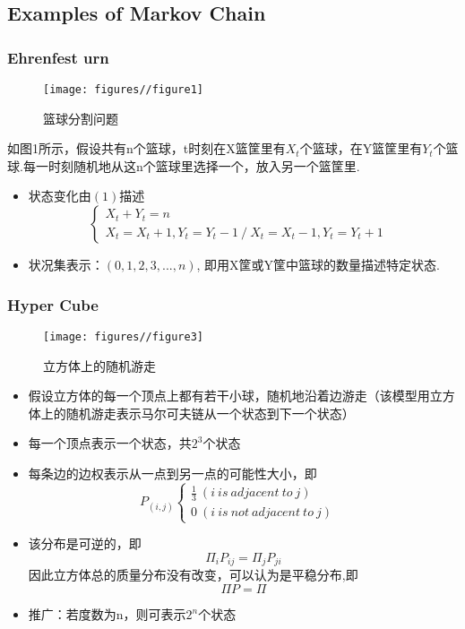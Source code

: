 \documentclass[a4paper, 11pt]{article} %
\begin{document}
\subsection{Examples of Markov Chain}
\subsubsection{Ehrenfest urn}
\begin{figure}[h]
    	\centering
    	\texttt{[image: figures//figure1]}
    	\caption{篮球分割问题}
\end{figure}
\begin{small}
如图1所示，假设共有n个篮球，t时刻在X篮筐里有$X_t$个篮球，在Y篮筐里有$Y_t$个篮球.每一时刻随机地从这n个篮球里选择一个，放入另一个篮筐里.
\begin{itemize}
	\item 状态变化由$(1)$描述
    \begin{equation}  
     \left\{  
             \begin{array}{lr}  
             X_t+Y_t=n &  \\  
             X_t=X_t+1, Y_t=Y_t-1\ /\ X_t=X_t-1,Y_t=Y_t+1 & 
            \end{array}  
    \right.  
    \end{equation}  
	
	\item 状况集表示：$(0,1,2,3,...,n)$, 即用X筐或Y筐中篮球的数量描述特定状态.
\end{itemize}
\end{small}
\newpage
\subsubsection{Hyper Cube}
\begin{small}
\begin{figure}[h]
    	\centering
    	\texttt{[image: figures//figure3]}
    	\caption{立方体上的随机游走}
\end{figure}
\begin{itemize}
	\item 假设立方体的每一个顶点上都有若干小球，随机地沿着边游走（该模型用立方体上的随机游走表示马尔可夫链从一个状态到下一个状态）
	\item 每一个顶点表示一个状态，共$2^3$个状态
	\item 每条边的边权表示从一点到另一点的可能性大小，即
	      \begin{equation}  
           P_{(i,j)}\left\{  
             \begin{array}{lr}  
              \frac{1}{3} \  (i\ is\ adjacent\ to\ j)&  \\  
             0 \  (i\ is\ not\ adjacent\ to\ j) & 
            \end{array}  
         \right.  
         \end{equation} 
	\item 该分布是可逆的，即
	$$\Pi _iP_{ij}=\Pi _jP_{ji}$$
	因此立方体总的质量分布没有改变，可以认为是平稳分布,即
	$$\Pi P= \Pi $$
	\item 推广：若度数为n，则可表示$2^n$个状态
\end{itemize}
\end{small}
\end{document}
